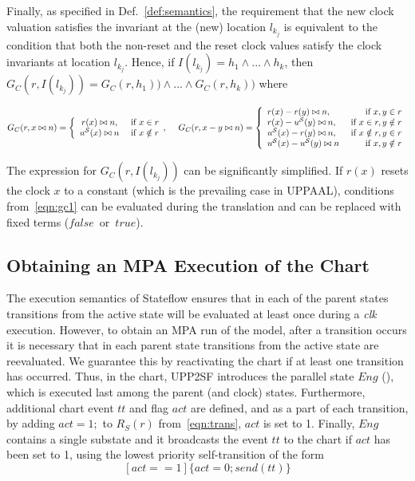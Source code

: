 Finally, as specified in Def.~\ref{def:semantics}, the requirement that the new clock valuation satisfies the invariant at the (new) location $l_{k_j}$ is equivalent to the condition that both the non-reset and the reset clock values satisfy the clock invariants at location $l_{k_j}$. Hence, if $I(l_{k_j})=h_1\wedge ...\wedge h_k$, then $G_C(r,I(l_{k_j}))=G_C(r,h_1))\wedge...\wedge G_C(r,h_k))$ where

\footnotesize
\vspace{-10pt}
\begin{equation}
\label{eqn:gc1}
G_C(r,x\bowtie n) = \left\{
\begin{array}{cc} 
r(x)\bowtie n, & \hbox{ if } x\in r\\
u^\mathcal{S}(x)\bowtie n & \hbox{ if } x\notin r 				
\end{array},
\right. 
\hspace{10pt}
G_C(r,x-y\bowtie n) = 
\left\{
\begin{array}{lr} 
r(x)-r(y)\bowtie n, & \hbox{ if } x,y\in r\\
r(x)-u^\mathcal{S}(y)\bowtie n, & \hbox{ if } x\in r,y\notin r\\
u^\mathcal{S}(x)-r(y)\bowtie n, & \hbox{ if } x\notin r,y\in r\\
u^\mathcal{S}(x)-u^\mathcal{S}(y)\bowtie n & \hbox{ if } x,y\notin r													  
\end{array}
\right.
\end{equation}
\normalsize

\noindent 
The expression for $G_C(r,I(l_{k_j}))$ can be significantly simplified. If $r(x)$ resets the clock $x$ to a constant (which is the prevailing case in UPPAAL), conditions from~\eqref{eqn:gc1} can be evaluated during the translation and can be replaced with fixed terms ($false$~or~$true$).



\subsection{Obtaining an MPA Execution of the Chart}
\label{sec:sfmpa}
The execution semantics of Stateflow ensures that in each of the parent states transitions from the active state will be evaluated at least once during a \textit{clk} execution. However, to obtain an MPA run of the model, after a transition occurs it is necessary that in each parent state transitions from the active state are reevaluated. We guarantee this by reactivating the chart if at least one transition has occurred. Thus, in the chart, UPP2SF introduces the parallel state $Eng$ (), which is executed last among the parent (and clock) states. Furthermore, additional chart event $tt$ and flag $act$ are defined, and as a part of each transition, by adding $act=1;$ to $R_S(r)$ from~\eqref{eqn:trans}, $act$ is set to 1. 
Finally, $Eng$ contains a single substate and it broadcasts the event $tt$ to the chart if $act$ has been set to 1, using the lowest priority self-transition of the form
\begin{equation}
\label{shrst}
[act==1]\{act=0; send(tt)\}
\end{equation}



